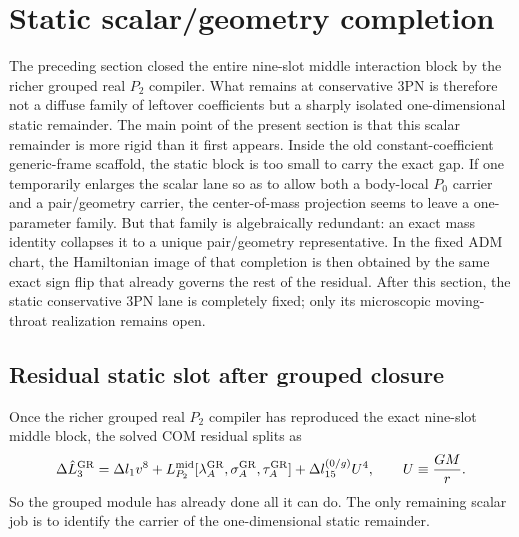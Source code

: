 \documentclass[11pt]{article}
\begin{document}
\section{Static scalar/geometry completion}
\label{sec:geometry}

The preceding section closed the entire nine-slot middle interaction block by the
richer grouped real $P_2$ compiler.  What remains at conservative $3$PN is
therefore not a diffuse family of leftover coefficients but a sharply isolated
one-dimensional static remainder.  The main point of the present section is that
this scalar remainder is more rigid than it first appears.  Inside the old
constant-coefficient generic-frame scaffold, the static block is too small to
carry the exact gap.  If one temporarily enlarges the scalar lane so as to allow
both a body-local $P_0$ carrier and a pair/geometry carrier, the center-of-mass
projection seems to leave a one-parameter family.  But that family is
algebraically redundant: an exact mass identity collapses it to a unique
pair/geometry representative.  In the fixed ADM chart, the Hamiltonian image of
that completion is then obtained by the same exact sign flip that already
governs the rest of the residual.  After this section, the static conservative
$3$PN lane is completely fixed; only its microscopic moving-throat realization
remains open.

\subsection{Residual static slot after grouped closure}
\label{sec:geometry-residual}

Once the richer grouped real $P_2$ compiler has reproduced the exact nine-slot
middle block, the solved COM residual splits as
\begin{equation}
\Delta \hat L_3^{\rm GR}
=
\Delta l_1 v^8
+
L_{P_2}^{\rm mid}[\lambda_A^{\rm GR},\sigma_A^{\rm GR},\tau_A^{\rm GR}]
+
\Delta l_{15}^{(0/g)} U^4,
\qquad
U\equiv \frac{GM}{r}.
\label{eq:geometry-static-split}
\end{equation}
So the grouped module has already done all it can do.  The only remaining scalar
job is to identify the carrier of the one-dimensional static remainder.
\end{document}
